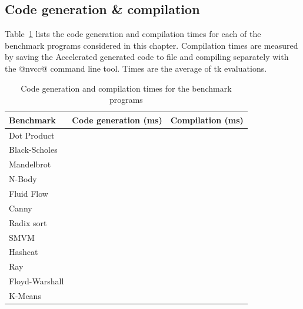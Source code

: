\subsection{Code generation \& compilation}

Table~\ref{tab:compilation_times} lists the code generation and compilation
times for each of the benchmark programs considered in this chapter. Compilation
times are measured by saving the Accelerated generated code to file and
compiling separately with the @nvcc@ command line tool. Times are the average of
tk evaluations.

\begin{table}
    \centering
    \begin{tabular}{lrr}
\textbf{Benchmark}
    & \multicolumn{1}{c}{Code generation (ms)}
    & \multicolumn{1}{c}{Compilation (ms)}
    \\
    \hline

Dot Product
    &
    &
    \\

Black-Scholes
    &
    &
    \\

Mandelbrot
    &
    &
    \\

N-Body
    &
    &
    \\

Fluid Flow
    &
    &
    \\

Canny
    &
    &
    \\

Radix sort
    &
    &
    \\

SMVM
    &
    &
    \\

Hashcat
    &
    &
    \\

Ray
    &
    &
    \\

Floyd-Warshall
    &
    &
    \\

K-Means
    &
    &
    \\

    \end{tabular}
    \caption{Code generation and compilation times for the benchmark programs}
    \label{tab:compilation_times}
\end{table}



